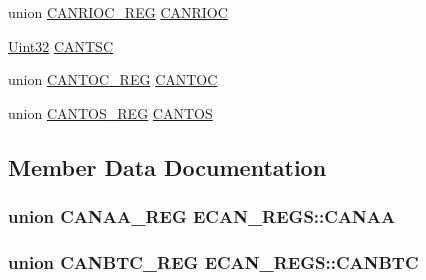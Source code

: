 \begin{DoxyCompactItemize}
\item 
union \hyperlink{union_c_a_n_r_i_o_c___r_e_g}{C\+A\+N\+R\+I\+O\+C\+\_\+\+R\+E\+G} \hyperlink{struct_e_c_a_n___r_e_g_s_af3a020a8937636a863d4658965040c15}{C\+A\+N\+R\+I\+O\+C}
\item 
\hyperlink{_d_s_p2833x___device_8h_aba99025e657f892beb7ff31cecf64653}{Uint32} \hyperlink{struct_e_c_a_n___r_e_g_s_af4fb85af8e3eda7b8f9cf582993d2993}{C\+A\+N\+T\+S\+C}
\item 
union \hyperlink{union_c_a_n_t_o_c___r_e_g}{C\+A\+N\+T\+O\+C\+\_\+\+R\+E\+G} \hyperlink{struct_e_c_a_n___r_e_g_s_af4bb973aceb55ecfae166dff92e868f7}{C\+A\+N\+T\+O\+C}
\item 
union \hyperlink{union_c_a_n_t_o_s___r_e_g}{C\+A\+N\+T\+O\+S\+\_\+\+R\+E\+G} \hyperlink{struct_e_c_a_n___r_e_g_s_a78d122f5120e0532b5370e6edd670314}{C\+A\+N\+T\+O\+S}
\end{DoxyCompactItemize}


\subsection{Member Data Documentation}
\hypertarget{struct_e_c_a_n___r_e_g_s_ad7be3ced3ac44283e8ef05caca7577d5}{}
\subsubsection[{C\+A\+N\+A\+A}]{\setlength{\rightskip}{0pt plus 5cm}union {\bf C\+A\+N\+A\+A\+\_\+\+R\+E\+G} E\+C\+A\+N\+\_\+\+R\+E\+G\+S\+::\+C\+A\+N\+A\+A}\label{struct_e_c_a_n___r_e_g_s_ad7be3ced3ac44283e8ef05caca7577d5}
\hypertarget{struct_e_c_a_n___r_e_g_s_a17f4e563f1eb0289e0b24812cb03ace3}{}
\subsubsection[{C\+A\+N\+B\+T\+C}]{\setlength{\rightskip}{0pt plus 5cm}union {\bf C\+A\+N\+B\+T\+C\+\_\+\+R\+E\+G} E\+C\+A\+N\+\_\+\+R\+E\+G\+S\+::\+C\+A\+N\+B\+T\+C}\label{struct_e_c_a_n___r_e_g_s_a17f4e563f1eb0289e0b24812cb03ace3}
\hypertarget{struct_e_c_a_n___r_e_g_s_ab92410d86dc259fee5047faf951c0177}{}
